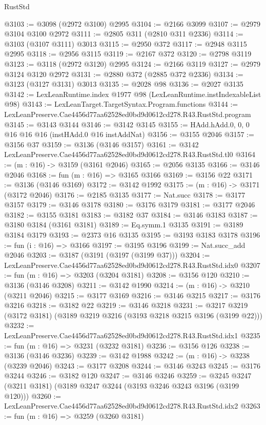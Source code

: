 \begin{lexlean}{RustStd}
\begin{coremodule}
@3103 := @3098 (@2972 @3100) @2995
@3104 := @2166 @3099
@3107 := @2979 @3104 @3100 @2972
@3111 := @2805 @311 (@2810 @311 @2336)
@3114 := @3103 (@3107 @3111) @3013
@3115 := @2950 @372
@3117 := @2948 @3115 @2995
@3118 := @2956 @3115
@3119 := @2167 @372
@3120 := @2798 @3119
@3123 := @3118 (@2972 @3120) @2995
@3124 := @2166 @3119
@3127 := @2979 @3124 @3120 @2972
@3131 := @2880 @372 (@2885 @372 @2336)
@3134 := @3123 (@3127 @3131) @3013
@3135 := @2028 @98
@3136 := @2027 @3135
@3142 := LexLeanRuntime.index @1977 @98 (LexLeanRuntime.instIndexableList @98)
@3143 := LexLeanTarget.TargetSyntax.Program.functions
@3144 := LexLeanPreserve.Cae4456d77aa62528ed0bd9d0612cd278.R43.RustStd.program
@3145 := @3143 @3144
@3146 := @3142 @3145
@3155 := HAdd.hAdd.{0, 0, 0} @16 @16 @16 (instHAdd.{0} @16 instAddNat)
@3156 := @3155 @2046
@3157 := @3156 @37
@3159 := @3136 (@3146 @3157)
@3161 := @3142 LexLeanPreserve.Cae4456d77aa62528ed0bd9d0612cd278.R43.RustStd.tl0
@3164 := (m : @16) -> @3159 (@3161 @2046)
@3165 := @2056 @3135
@3166 := @3146 @2046
@3168 := fun (m : @16) => @3165 @3166
@3169 := @3156 @22
@3171 := @3136 (@3146 @3169)
@3172 := @3142 @1992
@3175 := (m : @16) -> @3171 (@3172 @2046)
@3176 := @2185 @3135
@3177 := Nat.succ
@3178 := @3177 @3157
@3179 := @3146 @3178
@3180 := @3176 @3179
@3181 := @3177 @2046
@3182 := @3155 @3181
@3183 := @3182 @37
@3184 := @3146 @3183
@3187 := @3180 @3184 (@3161 @3181)
@3189 := Eq.symm.{1} @3135
@3191 := @3189 @3184 @3179
@3193 := @2373 @16 @3135
@3195 := @3193 @3183 @3178
@3196 := fun (i : @16) => @3166
@3197 := @3195 @3196
@3199 := Nat.succ_add @2046
@3203 := @3187 (@3191 (@3197 (@3199 @37)))
@3204 := LexLeanPreserve.Cae4456d77aa62528ed0bd9d0612cd278.R43.RustStd.idx0
@3207 := fun (m : @16) => @3203 (@3204 @3181)
@3208 := @3156 @120
@3210 := @3136 (@3146 @3208)
@3211 := @3142 @1990
@3214 := (m : @16) -> @3210 (@3211 @2046)
@3215 := @3177 @3169
@3216 := @3146 @3215
@3217 := @3176 @3216
@3218 := @3182 @22
@3219 := @3146 @3218
@3231 := @3217 @3219 (@3172 @3181) (@3189 @3219 @3216 (@3193 @3218 @3215 @3196 (@3199 @22)))
@3232 := LexLeanPreserve.Cae4456d77aa62528ed0bd9d0612cd278.R43.RustStd.idx1
@3235 := fun (m : @16) => @3231 (@3232 @3181)
@3236 := @3156 @126
@3238 := @3136 (@3146 @3236)
@3239 := @3142 @1988
@3242 := (m : @16) -> @3238 (@3239 @2046)
@3243 := @3177 @3208
@3244 := @3146 @3243
@3245 := @3176 @3244
@3246 := @3182 @120
@3247 := @3146 @3246
@3259 := @3245 @3247 (@3211 @3181) (@3189 @3247 @3244 (@3193 @3246 @3243 @3196 (@3199 @120)))
@3260 := LexLeanPreserve.Cae4456d77aa62528ed0bd9d0612cd278.R43.RustStd.idx2
@3263 := fun (m : @16) => @3259 (@3260 @3181)

\end{coremodule}
\end{lexlean}
